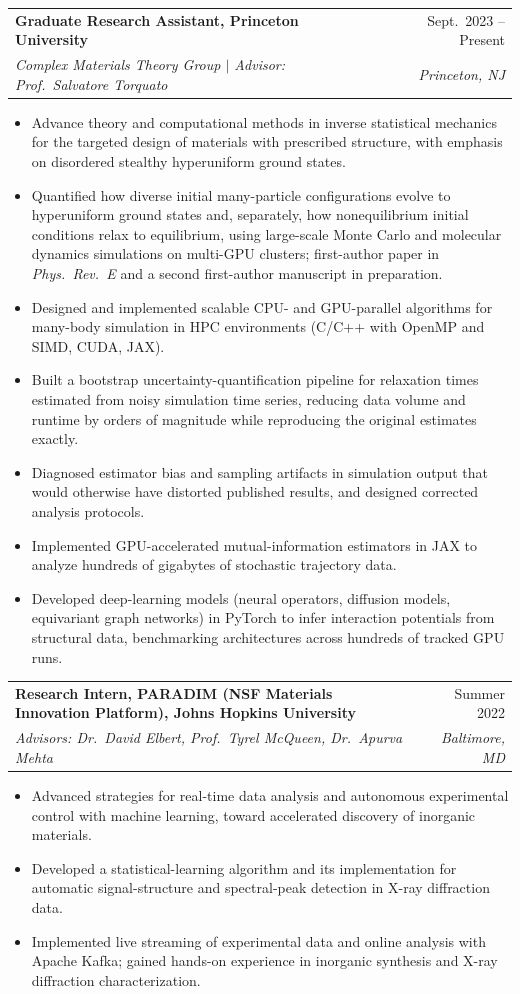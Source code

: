 \documentclass[letterpaper,10pt]{article}
\makeatletter
\newcommand{\resumeItem}[1]{\item\small{{#1 \vspace{-1pt}}}}
\newcommand{\resumeSubheading}[4]{
  \vspace{-1pt}\item
    \begin{tabular*}{0.97\textwidth}[t]{l@{\extracolsep{\fill}}r}
      \textbf{#1} & #2 \\
      \textit{\small#3} & \textit{\small #4} \\
    \end{tabular*}\vspace{-6pt}
}
\newcommand{\resumeItemListStart}{\begin{itemize}[itemsep=0pt, topsep=2pt]}
\newcommand{\resumeItemListEnd}{\end{itemize}\vspace{-4pt}}
\makeatother
\begin{document}
    \resumeSubheading
      {Graduate Research Assistant, Princeton University}{Sept.\ 2023 -- Present}
      {\textnormal{Complex Materials Theory Group $\mid$ Advisor: Prof.\ Salvatore Torquato}}{Princeton, NJ}
      \resumeItemListStart
        \resumeItem{Advance theory and computational methods in inverse statistical mechanics for the targeted design of materials with prescribed structure, with emphasis on disordered stealthy hyperuniform ground states.}
        \resumeItem{Quantified how diverse initial many-particle configurations evolve to hyperuniform ground states and, separately, how nonequilibrium initial conditions relax to equilibrium, using large-scale Monte Carlo and molecular dynamics simulations on multi-GPU clusters; first-author paper in \emph{Phys.\ Rev.\ E} and a second first-author manuscript in preparation.}
        \resumeItem{Designed and implemented scalable CPU- and GPU-parallel algorithms for many-body simulation in HPC environments (C/C++ with OpenMP and SIMD, CUDA, JAX).}
        \resumeItem{Built a bootstrap uncertainty-quantification pipeline for relaxation times estimated from noisy simulation time series, reducing data volume and runtime by orders of magnitude while reproducing the original estimates exactly.}
        \resumeItem{Diagnosed estimator bias and sampling artifacts in simulation output that would otherwise have distorted published results, and designed corrected analysis protocols.}
        \resumeItem{Implemented GPU-accelerated mutual-information estimators in JAX to analyze hundreds of gigabytes of stochastic trajectory data.}
        \resumeItem{Developed deep-learning models (neural operators, diffusion models, equivariant graph networks) in PyTorch to infer interaction potentials from structural data, benchmarking architectures across hundreds of tracked GPU runs.}
      \resumeItemListEnd

    \resumeSubheading
      {Research Intern, PARADIM (NSF Materials Innovation Platform), Johns Hopkins University}{Summer 2022}
      {\textnormal{Advisors: Dr.\ David Elbert, Prof.\ Tyrel McQueen, Dr.\ Apurva Mehta}}{Baltimore, MD}
      \resumeItemListStart
        \resumeItem{Advanced strategies for real-time data analysis and autonomous experimental control with machine learning, toward accelerated discovery of inorganic materials.}
        \resumeItem{Developed a statistical-learning algorithm and its implementation for automatic signal-structure and spectral-peak detection in X-ray diffraction data.}
        \resumeItem{Implemented live streaming of experimental data and online analysis with Apache Kafka; gained hands-on experience in inorganic synthesis and X-ray diffraction characterization.}
      \resumeItemListEnd
\end{document}

